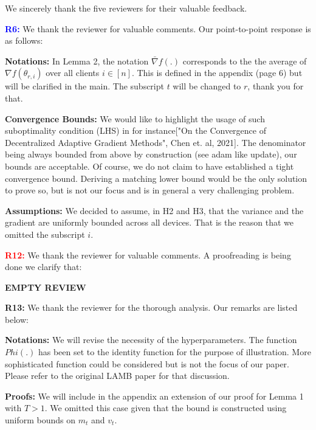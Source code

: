 \documentclass{article}
\begin{document}
We sincerely thank the five reviewers for their valuable feedback.


\vspace{0.01in}

\textbf{\textcolor{blue}{R6:}} We thank the reviewer for valuable comments. Our point-to-point response is as follows:\vspace{-5pt}

\textbf{Notations:} In Lemma 2, the notation $\bar{\nabla} f(.)$ corresponds to the the average of $\nabla f(\theta_{r,i})$ over all clients $i \in [n]$. This is defined in the appendix (page 6) but will be clarified in the main.
The subscript $t$ will be changed to $r$, thank you for that.

\textbf{Convergence Bounds:} 
We would like to highlight the usage of such suboptimality condition (LHS) in for instance["On the Convergence of Decentralized Adaptive Gradient Methods", Chen et. al, 2021]. The denominator being always bounded from above by construction (see adam like update), our bounds are acceptable. Of course, we do not claim to have established a tight convergence bound. Deriving a matching lower bound would be the only solution to prove so, but is not our focus and is in general a very challenging problem.


\textbf{Assumptions:} 
We decided to assume, in H2 and H3, that the variance and the gradient are uniformly bounded across all devices.
That is the reason that we omitted the subscript $i$.


\vspace{0.01in}


\textbf{\textcolor{red}{R12:}} We thank the reviewer for valuable comments. A proofreading is being done we clarify that:\vspace{-5pt}

\textbf{EMPTY REVIEW} 


\vspace{0.01in}
\textbf{\textcolor{green!50!black}{R13:}} We thank the reviewer for the thorough analysis. Our remarks are listed below:\vspace{-5pt}

\textbf{Notations:} 
We will revise the necessity of the hyperparameters.
The function $Phi(.)$ has been set to the identity function for the purpose of illustration. More sophisticated function could be considered but is not the focus of our paper. Please refer to the original LAMB paper for that discussion.

\textbf{Proofs:} We will include in the appendix an extension of our proof for Lemma 1 with $T > 1$. We omitted this case given that the bound is constructed using uniform bounds on $m_t$ and $v_t$.
\end{document}
